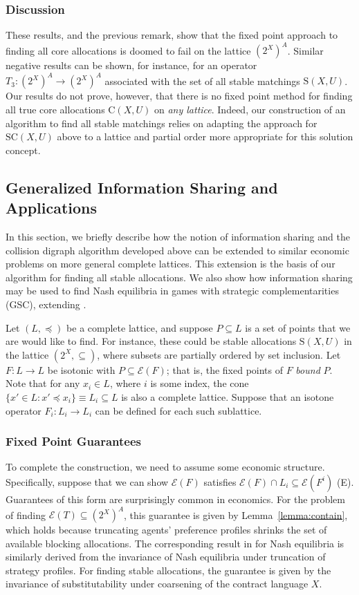 \documentclass[11pt,reqno]{amsart}
\theoremstyle{definition}
\numberwithin{equation}{section}
\newcommand{\prealloc}{(2^X)^A}
\newcommand{\sub}{\subseteq}
\newcommand{\strcore}{\mathrm{SC}(X,U)}
\newcommand{\core}{\mathrm{C}(X,U)}
\newcommand{\stable}{\mathrm{S}(X,U)}
\newcommand{\fix}{\mathcal{E}}
\newcommand{\peq}{\preceq}
\newcommand{\opthree}{T_3}
\newcommand{\oper}{F}
\newcommand{\point}{P}
\newcommand{\lattice}{L}
\begin{document}
\subsubsection{Discussion} 
These results, and the previous remark, show that the fixed point approach to finding all core allocations is doomed to fail on the lattice $\prealloc$.
Similar negative results can be shown, for instance, for an operator $\opthree: \prealloc \to \prealloc$ associated with the set of all stable matchings $\stable$.
Our results do not prove, however, that there is no fixed point method for finding all true core allocations $\core$ on \emph{any lattice}.
Indeed, our construction of an algorithm to find all stable matchings relies on adapting the approach for $\strcore$ above to a lattice and partial order more appropriate for this solution concept. 

\subsection{Generalized Information Sharing and Applications} \label{section:general}
In this section, we briefly describe how the notion of information sharing and the collision digraph algorithm developed above can be extended to similar economic problems on more general complete lattices.
This extension is the basis of our algorithm for finding all stable allocations. 
We also show how information sharing may be used to find Nash equilibria in games with strategic complementarities (GSC), extending \cite{Echenique2007Equilibria}.

Let $(\lattice,\peq)$ be a complete lattice, and suppose $\point \sub \lattice$ is a set of points that we are would like to find. 
For instance, these could be stable allocations $\stable$ in the lattice $(2^X,\sub)$, where subsets are partially ordered by set inclusion. 
Let $\oper: \lattice \to \lattice$ be isotonic with $\point \sub \fix(\oper)$; that is, the fixed points of $\oper$ \emph{bound} $\point$.
Note that for any $x_i \in \lattice$, where $i$ is some index, the cone $\{x' \in \lattice: x' \peq x_i\} \equiv \lattice_i \sub L$ is also a complete lattice.
Suppose that an isotone operator $F_i : \lattice_i \to \lattice_i$ can be defined for each such sublattice.

\subsubsection{Fixed Point Guarantees} 
To complete the construction, we need to assume some economic structure. 
Specifically, suppose that we can show $\fix(\oper)$ satisfies $\fix(\oper) \cap \lattice_i \sub \fix(\oper^i)$ (E).
Guarantees of this form are surprisingly common in economics.
For the problem of finding $\fix(T) \sub \prealloc$, this guarantee is given by Lemma~\ref{lemma:contain}, which holds because truncating agents' preference profiles shrinks the set of available blocking allocations.
The corresponding result in \cite{Echenique2007Equilibria} for Nash equilibria is similarly derived from the invariance of Nash equilibria under truncation of strategy profiles.
For finding stable allocations, the guarantee is given by the invariance of substitutability under coarsening of the contract language $X$.
\end{document}
